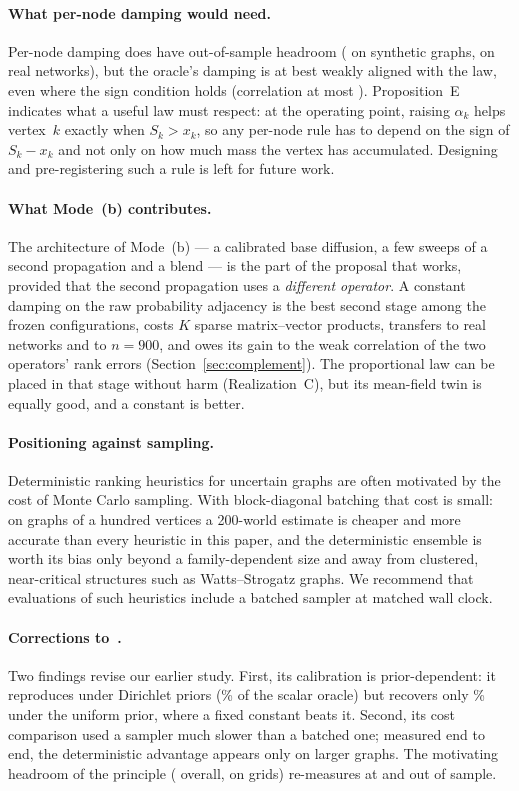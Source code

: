 \documentclass[11pt,a4paper]{article}
\theoremstyle{definition}
\theoremstyle{plain}
\begin{document}
\paragraph{What per-node damping would need.} Per-node damping does have out-of-sample headroom (\HeadAll{} on synthetic graphs, \RealHeadroom{} on real networks), but the oracle's damping is at best weakly aligned with the law, even where the sign condition holds (correlation at most \SignMaxCorr). Proposition~E indicates what a useful law must respect: at the operating point, raising $\alpha_k$ helps vertex~$k$ exactly when $S_k>x_k$, so any per-node rule has to depend on the sign of $S_k-x_k$ and not only on how much mass the vertex has accumulated. Designing and pre-registering such a rule is left for future work.

\paragraph{What Mode~(b) contributes.} The architecture of Mode~(b) --- a calibrated base diffusion, a few sweeps of a second propagation and a blend --- is the part of the proposal that works, provided that the second propagation uses a \emph{different operator}. A constant damping on the raw probability adjacency is the best second stage among the frozen configurations, costs $K$ sparse matrix--vector products, transfers to real networks and to $n=900$, and owes its gain to the weak correlation of the two operators' rank errors (Section~\ref{sec:complement}). The proportional law can be placed in that stage without harm (Realization~C), but its mean-field twin is equally good, and a constant is better.

\paragraph{Positioning against sampling.} Deterministic ranking heuristics for uncertain graphs are often motivated by the cost of Monte Carlo sampling. With block-diagonal batching that cost is small: on graphs of a hundred vertices a 200-world estimate is cheaper and more accurate than every heuristic in this paper, and the deterministic ensemble is worth its bias only beyond a family-dependent size and away from clustered, near-critical structures such as Watts--Strogatz graphs. We recommend that evaluations of such heuristics include a batched sampler at matched wall clock.

\paragraph{Corrections to~\cite{konstantellos26}.} Two findings revise our earlier study. First, its calibration is prior-dependent: it reproduces under Dirichlet priors (\RepPctDir\% of the scalar oracle) but recovers only \RepPctUnif\% under the uniform prior, where a fixed constant beats it. Second, its cost comparison used a sampler much slower than a batched one; measured end to end, the deterministic advantage appears only on larger graphs. The motivating headroom of the principle (\PrevHeadAll{} overall, \PrevHeadGrid{} on grids) re-measures at \HeadAll{} and \HeadGrid{} out of sample.
\end{document}
